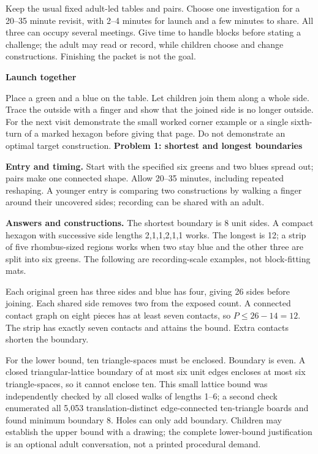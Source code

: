 \documentclass[11pt]{article}
\newcommand\lead[1]{\textbf{#1}\par}
\begin{document}
Keep the usual fixed adult-led tables and pairs. Choose one investigation for a 20--35 minute revisit, with 2--4 minutes for launch and a few minutes to share. All three can occupy several meetings. Give time to handle blocks before stating a challenge; the adult may read or record, while children choose and change constructions. Finishing the packet is not the goal.

\lead{Launch together}
Place a green and a blue on the table. Let children join them along a whole side. Trace the outside with a finger and show that the joined side is no longer outside. For the next visit demonstrate the small worked corner example or a single sixth-turn of a marked hexagon before giving that page. Do not demonstrate an optimal target construction.
\newpage
\lead{Problem 1: shortest and longest boundaries}
\textbf{Entry and timing.} Start with the specified six greens and two blues spread out; pairs make one connected shape. Allow 20--35 minutes, including repeated reshaping. A younger entry is comparing two constructions by walking a finger around their uncovered sides; recording can be shared with an adult.

\textbf{Answers and constructions.} The shortest boundary is 8 unit sides. A compact hexagon with successive side lengths 2,1,1,2,1,1 works. The longest is 12; a strip of five rhombus-sized regions works when two stay blue and the other three are split into six greens. The following are recording-scale examples, not block-fitting mats.

\begin{center}\hspace{0.45in}\end{center}

Each original green has three sides and blue has four, giving 26 sides before joining. Each shared side removes two from the exposed count. A connected contact graph on eight pieces has at least seven contacts, so $P\le26-14=12$. The strip has exactly seven contacts and attains the bound. Extra contacts shorten the boundary.

For the lower bound, ten triangle-spaces must be enclosed. Boundary is even. A closed triangular-lattice boundary of at most six unit edges encloses at most six triangle-spaces, so it cannot enclose ten. This small lattice bound was independently checked by all closed walks of lengths 1--6; a second check enumerated all 5,053 translation-distinct edge-connected ten-triangle boards and found minimum boundary 8. Holes can only add boundary. Children may establish the upper bound with a drawing; the complete lower-bound justification is an optional adult conversation, not a printed procedural demand.
\end{document}
